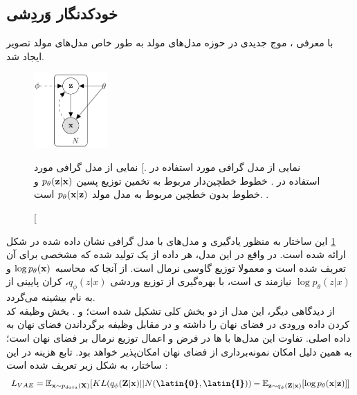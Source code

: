 \subsection{خودکدنگار وَردِشی}
با معرفی \vae{}،
موج جدیدی در حوزه مدل‌های مولد به طور خاص مدل‌های مولد تصویر ایجاد شد.
\begin{figure}[H]
	\centering
	\includegraphics[width=0.25\textwidth]{images/vae-pgm.png}
	\caption
    [نمایی از مدل گرافی مورد استفاده در \vae{}.]
    {
		نمایی از مدل گرافی مورد استفاده در \vae{}. خطوط خطچین‌‌دار مربوط به تخمین توزیع پسین $p_\theta({\bf z}|{\bf x})$ و خطوط بدون خطچین مربوط به مدل مولد
		$p_\theta({\bf x}|{\bf z})$
		است.
		\cite{vae_text}.}
	\label{fig:vae-pgm}
\end{figure}
این ساختار به منظور یادگیری و 
مدل‌های با مدل گرافی نشان داده شده در شکل ‎\ref{fig:vae-pgm}‎ ارائه شده است. در واقع در این مدل، هر داده از یک   تولید شده که \priordist{} مشخصی برای آن تعریف شده است و معمولا توزیع گاوسی نرمال است. از آنجا که محاسبه $\log p_\theta({\bf x})$ و $\log p_\theta (z|x)$ نیازمند \inference ی 
است، با بهره‌گیری از  توزیع وردشی $q_\phi(z|x)$، کران پایینی از \likelihood{} به نام  بیشینه می‌گردد.\\
از دیدگاهی دیگر، این مدل از دو بخش کلی تشکیل شده است؛ \encoder{} و \decoder{}. بخش \encoder{} وظیفه کد کردن داده ورودی در فضای نهان را داشته و در مقابل \decoder{} وظیفه برگرداندن فضای نهان به داده اصلی. تفاوت این مدل‌ها با \autoencoder{}ها در فرض و اعمال توزیع نرمال بر فضای نهان است؛ به همین دلیل امکان نمونه‌برداری از فضای نهان امکان‌پذیر خواهد بود. تابع هزینه در این ساختار، به شکل زیر تعریف شده است \cite{vae}:
\begin{equation} \label{eq:vae}
	\begin{split}
		L_{VAE} = \expected_{\bff{x} \sim p_{data}(\bff{X})} [KL(q_\phi(\bff{Z}|\bff{x}) || N(\textbf{\latin{0}},\textbf{\latin{I}}))- \expected_{\bff{z} \sim q_\phi(\bff{Z}|\bff{x})}[\log p_\theta(\bff{x}|\bff{z})]]
	\end{split}
\end{equation}
